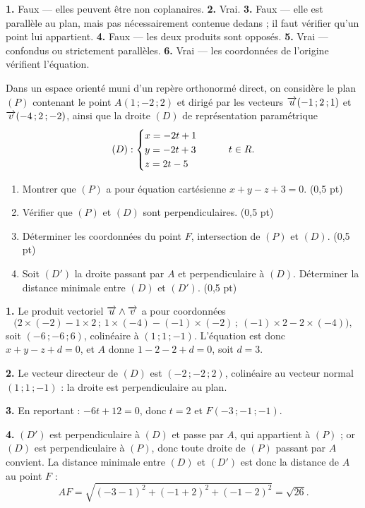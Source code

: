 \begin{corrige}[je me teste]
\textbf{1.} Faux — elles peuvent être non coplanaires.
\textbf{2.} Vrai.
\textbf{3.} Faux — elle est parallèle au plan, mais pas nécessairement
contenue dedans ; il faut vérifier qu'un point lui appartient.
\textbf{4.} Faux — les deux produits sont opposés.
\textbf{5.} Vrai — confondus ou strictement parallèles.
\textbf{6.} Vrai — les coordonnées de l'origine vérifient l'équation.
\end{corrige}

\begin{commeaubac}
Dans un espace orienté muni d'un repère orthonormé direct, on considère le
plan $(P)$ contenant le point $A(1\,;-2\,;2)$ et dirigé par les vecteurs
$\overrightarrow{u}(-1\,;2\,;1)$ et $\overrightarrow{v}(-4\,;2\,;-2)$, ainsi que la droite $(D)$ de
représentation paramétrique
\[
  (D) : \begin{cases} x = -2t+1 \\ y = -2t+3 \\ z = 2t-5 \end{cases}
  \qquad t \in R .
\]

\begin{enumerate}[label=\textbf{\arabic*.}, leftmargin=*, itemsep=0.25em]
  \item Montrer que $(P)$ a pour équation cartésienne $x+y-z+3 = 0$.
        \hfill\textup{(0,5 pt)}
  \item Vérifier que $(P)$ et $(D)$ sont perpendiculaires.
        \hfill\textup{(0,5 pt)}
  \item Déterminer les coordonnées du point $F$, intersection de $(P)$ et
        $(D)$. \hfill\textup{(0,5 pt)}
  \item Soit $(D')$ la droite passant par $A$ et perpendiculaire à $(D)$.
        Déterminer la distance minimale entre $(D)$ et $(D')$.
        \hfill\textup{(0,5 pt)}
\end{enumerate}
\end{commeaubac}

\begin{corrige}
\textbf{1.} Le produit vectoriel $\overrightarrow{u} \wedge \overrightarrow{v}$ a pour coordonnées
\[
  \bigl(2 \times (-2)-1 \times 2\,;\ 1 \times (-4)-(-1) \times (-2)\,;\
  (-1) \times 2-2 \times (-4)\bigr),
\]
soit $(-6\,;-6\,;6)$, colinéaire à $(1\,;1\,;-1)$. L'équation est donc $x+y-z+d = 0$, et $A$ donne
$1-2-2+d = 0$, soit $d = 3$.

\textbf{2.} Le vecteur directeur de $(D)$ est $(-2\,;-2\,;2)$, colinéaire au
vecteur normal $(1\,;1\,;-1)$ : la droite est perpendiculaire au plan.

\textbf{3.} En reportant : $-6t+12 = 0$, donc $t = 2$ et
$F(-3\,;-1\,;-1)$.

\textbf{4.} $(D')$ est perpendiculaire à $(D)$ et passe par $A$, qui
appartient à $(P)$ ; or $(D)$ est perpendiculaire à $(P)$, donc toute droite
de $(P)$ passant par $A$ convient. La distance minimale entre $(D)$ et
$(D')$ est donc la distance de $A$ au point $F$ :
\[
  AF = \sqrt{(-3-1)^{2}+(-1+2)^{2}+(-1-2)^{2}} = \sqrt{26}.
\]
\end{corrige}

